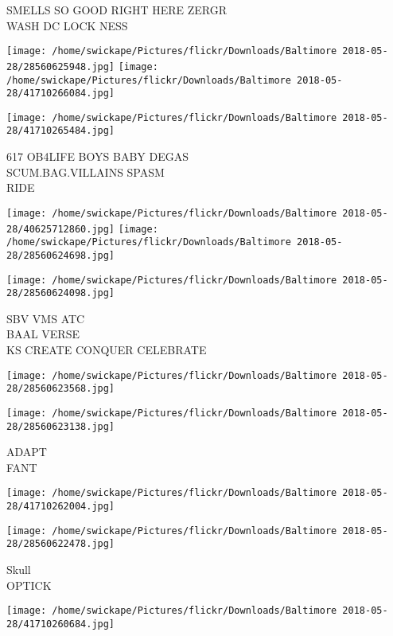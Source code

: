 \documentclass[10pt,letterpaper]{article}
\begin{document}
SMELLS SO GOOD RIGHT HERE ZERGR\\
WASH DC LOCK NESS\\
\pagebreak

\texttt{[image: /home/swickape/Pictures/flickr/Downloads/Baltimore 2018-05-28/28560625948.jpg]}
\texttt{[image: /home/swickape/Pictures/flickr/Downloads/Baltimore 2018-05-28/41710266084.jpg]}

\vspace{0.25in}
\texttt{[image: /home/swickape/Pictures/flickr/Downloads/Baltimore 2018-05-28/41710265484.jpg]}

617 OB4LIFE BOYS BABY DEGAS\\
SCUM.BAG.VILLAINS SPASM\\
RIDE\\
\pagebreak

\texttt{[image: /home/swickape/Pictures/flickr/Downloads/Baltimore 2018-05-28/40625712860.jpg]}
\texttt{[image: /home/swickape/Pictures/flickr/Downloads/Baltimore 2018-05-28/28560624698.jpg]}

\texttt{[image: /home/swickape/Pictures/flickr/Downloads/Baltimore 2018-05-28/28560624098.jpg]}

SBV VMS ATC\\
BAAL VERSE\\
KS CREATE CONQUER CELEBRATE\\
\pagebreak

\texttt{[image: /home/swickape/Pictures/flickr/Downloads/Baltimore 2018-05-28/28560623568.jpg]}

\vspace{0.25in}
\texttt{[image: /home/swickape/Pictures/flickr/Downloads/Baltimore 2018-05-28/28560623138.jpg]}

ADAPT\\
FANT\\
\pagebreak

\texttt{[image: /home/swickape/Pictures/flickr/Downloads/Baltimore 2018-05-28/41710262004.jpg]}

\vspace{0.25in}
\texttt{[image: /home/swickape/Pictures/flickr/Downloads/Baltimore 2018-05-28/28560622478.jpg]}

Skull\\
OPTICK\\
\pagebreak

\texttt{[image: /home/swickape/Pictures/flickr/Downloads/Baltimore 2018-05-28/41710260684.jpg]}
\end{document}
